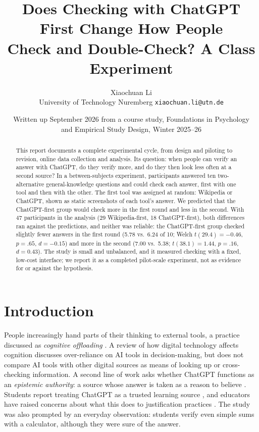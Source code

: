 \documentclass[11pt,a4paper]{article}
\title{\vspace{-1.2em}\textbf{Does Checking with ChatGPT First Change How People\\Check and Double-Check? A Class Experiment}}
\author{Xiaochuan Li\\[0.2em]\small University of Technology Nuremberg \quad \texttt{xiaochuan.li@utn.de}}
\date{\small Written up September 2026 from a course study, Foundations in Psychology\\ and Empirical Study Design, Winter 2025--26}
\begin{document}
\maketitle

\begin{abstract}
\noindent
This report documents a complete experimental cycle, from design and piloting to revision, online data collection and analysis. Its question: when people can verify an answer with ChatGPT, do they verify more, and do they then look less often at a second source? In a between-subjects experiment, participants answered ten two-alternative general-knowledge questions and could check each answer, first with one tool and then with the other. The first tool was assigned at random: Wikipedia or ChatGPT, shown as static screenshots of each tool's answer. We predicted that the ChatGPT-first group would check more in the first round and less in the second. With 47 participants in the analysis (29 Wikipedia-first, 18 ChatGPT-first), both differences ran against the predictions, and neither was reliable: the ChatGPT-first group checked slightly fewer answers in the first round (5.78 vs.\ 6.24 of 10; Welch $t(29.4) = -0.46$, $p = .65$, $d = -0.15$) and more in the second (7.00 vs.\ 5.38; $t(38.1) = 1.44$, $p = .16$, $d = 0.43$). The study is small and unbalanced, and it measured checking with a fixed, low-cost interface; we report it as a completed pilot-scale experiment, not as evidence for or against the hypothesis.
\end{abstract}

\section{Introduction}
People increasingly hand parts of their thinking to external tools, a practice discussed as \emph{cognitive offloading} \citep{shanmugasundaram}. A review of how digital technology affects cognition discusses over-reliance on AI tools in decision-making, but does not compare AI tools with other digital sources as means of looking up or cross-checking information. A second line of work asks whether ChatGPT functions as an \emph{epistemic authority}: a source whose answer is taken as a reason to believe \citep{hauswald,richards}. Students report treating ChatGPT as a trusted learning source \citep{rastogi}, and educators have raised concerns about what this does to justification practices \citep{cooper,jose}. The study was also prompted by an everyday observation: students verify even simple sums with a calculator, although they were sure of the answer.
\end{document}
